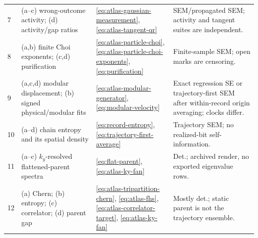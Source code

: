 \documentclass[aps,prb,twocolumn,floatfix,nofootinbib,superscriptaddress]{revtex4-2}
\begin{document}
\begin{table}[p]
\begin{tabularx}{\textwidth}{p{}p{}Xp{}}
7 & (a--c) wrong-outcome activity; (d) activity/gap ratios
& \eqref{eq:atlas-gaussian-measurement}, \eqref{eq:atlas-tangent-qr}
& SEM/propagated SEM; activity and tangent suites are independent.\\
8 & (a,b) finite Choi exponents; (c,d) purification
& \eqref{eq:atlas-particle-choi}, \eqref{eq:atlas-particle-choi-exponents},
\eqref{eq:purification}
& Finite-sample SEM; open marks are censoring.\\
9 & (a,c,d) modular displacement; (b) signed physical/modular fits
& \eqref{eq:atlas-modular-generator}, \eqref{eq:modular-velocity}
& Exact regression SE or trajectory-first SEM after within-record origin averaging;
clocks differ.\\
10 & (a--d) chain entropy and its spatial density
& \eqref{eq:record-entropy}, \eqref{eq:trajectory-first-average}
& Trajectory SEM; no realized-bit self-information.\\
11 & (a--c) $k_y$-resolved flattened-parent spectra
& \eqref{eq:flat-parent}, \eqref{eq:atlas-ky-fan}
& Det.; archived render, no exported eigenvalue rows.\\
12 & (a) Chern; (b) entropy; (c) correlator; (d) parent gap
& \eqref{eq:atlas-tripartition-chern}, \eqref{eq:atlas-fhs},
\eqref{eq:atlas-correlator-target}, \eqref{eq:atlas-ky-fan}
& Mostly det.; static parent is not the trajectory ensemble.\\
\bottomrule
\end{tabularx}
\end{table}
\end{document}
